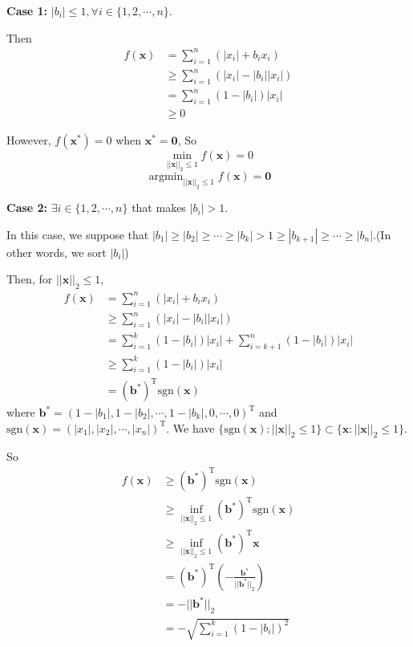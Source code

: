 \documentclass{article}
\begin{document}
\textbf{Case 1:} $|b_{i}|\leq 1, \forall i\in \{1,2,\cdots,n\}$.

Then
\begin{align*}
f(\bm{x})&=\sum_{i=1}^{n}\left(|x_{i}|+b_{i}x_{i}\right)\\
&\geq\sum_{i=1}^{n}\left(|x_{i}|-|b_{i}||x_{i}|\right)\\
&=\sum_{i=1}^{n}(1-|b_{i}|)|x_{i}|\\
&\geq 0
\end{align*}

However, $f(\bm{x^{*}})=0$ when $\bm{x^{*}}=\bm{0}$, So $$\min_{||\bm{x}||_{2}\leq1}f(\bm{x})=0$$
$$\mathop{\arg\min}_{||\bm{x}||_{2}\leq1}f(\bm{x})=\bm{0}$$

\textbf{Case 2:} $\exists i\in \{1,2,\cdots,n\}$ that makes $|b_{i}|>1$.

In this case, we suppose that $|b_{1}|\geq|b_{2}|\geq \cdots \geq |b_{k}|>1\geq|b_{k+1}|\geq\cdots\geq|b_{n}|$.(In other words, we sort $|b_{i}|$)

Then, for $||\bm{x}||_{2}\leq1$,
\begin{align*}
f(\bm{x})&=\sum_{i=1}^{n}\left(|x_{i}|+b_{i}x_{i}\right)\\
&\geq\sum_{i=1}^{n}\left(|x_{i}|-|b_{i}||x_{i}|\right)\\
&=\sum_{i=1}^{k}(1-|b_{i}|)|x_{i}|+\sum_{i=k+1}^{n}(1-|b_{i}|)|x_{i}|\\
&\geq \sum_{i=1}^{k}(1-|b_{i}|)|x_{i}|\\
&=(\bm{b}^{*})^{\mathrm{T}}\mathrm{sgn}(\bm{x})
\end{align*}
where $\bm{b}^{*}=(1-|b_{1}|,1-|b_{2}|,\cdots,1-|b_{k}|,0,\cdots,0)^{\mathrm{T}}$ and $\mathrm{sgn}(\bm{x})=(|x_{1}|,|x_{2}|,\cdots,|x_{n}|)^{\mathrm{T}}$. We have $\{\mathrm{sgn}(\bm{x}):||\bm{x}||_{2}\leq1\}\subset\{\bm{x}:||\bm{x}||_{2}\leq1\}$.

So
\begin{align*}
f(\bm{x})&\geq(\bm{b}^{*})^{\mathrm{T}}\mathrm{sgn}(\bm{x})\\
&\geq \inf_{||\bm{x}||_{2}\leq1}(\bm{b}^{*})^{\mathrm{T}}\mathrm{sgn}(\bm{x})\\
&\geq\inf_{||\bm{x}||_{2}\leq1}(\bm{b}^{*})^{\mathrm{T}}\bm{x}\\
&=(\bm{b}^{*})^{\mathrm{T}}\left(-\frac{\bm{b}^{*}}{||\bm{b}^{*}||_{2}}\right)\\
&=-||\bm{b}^{*}||_{2}\\
&=-\sqrt{\sum_{i=1}^{k}(1-|b_{i}|)^{2}}
\end{align*}
\end{document}
